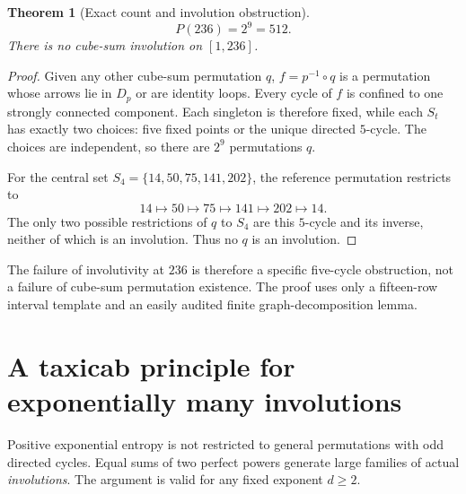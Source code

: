\documentclass[10pt]{article}
\newtheorem{theorem}{Theorem}
\begin{document}
\begin{theorem}[Exact count and involution obstruction]\label{thm:236}
\[
\boxed{P(236)=2^9=512.}
\]
There is no cube-sum involution on $[1,236]$.
\end{theorem}
\begin{proof}
Given any other cube-sum permutation $q$,
$f=p^{-1}\circ q$ is a permutation whose arrows
lie in $D_p$ or are identity loops. Every cycle of
$f$ is confined to one strongly connected component.
Each singleton is therefore fixed, while each $S_t$
has exactly two choices: five fixed points or the
unique directed $5$-cycle. The choices are independent,
so there are $2^9$ permutations $q$.

For the central set $S_4=\{14,50,75,141,202\}$,
the reference permutation restricts to
\[
14\mapsto50\mapsto75\mapsto141
\mapsto202\mapsto14.
\]
The only two possible restrictions of $q$ to $S_4$
are this $5$-cycle and its inverse, neither of
which is an involution. Thus no $q$ is an involution.
\end{proof}

The failure of involutivity at $236$ is therefore a
specific five-cycle obstruction, not a failure of
cube-sum permutation existence. The proof uses
only a fifteen-row interval template and an easily
audited finite graph-decomposition lemma.

\section{A taxicab principle for exponentially many involutions}
\label{sec:taxicab-involutions}

Positive exponential entropy is not restricted to
general permutations with odd directed cycles.
Equal sums of two perfect powers generate
large families of actual \emph{involutions}.
The argument is valid for any fixed exponent
$d\ge2$.
\end{document}
